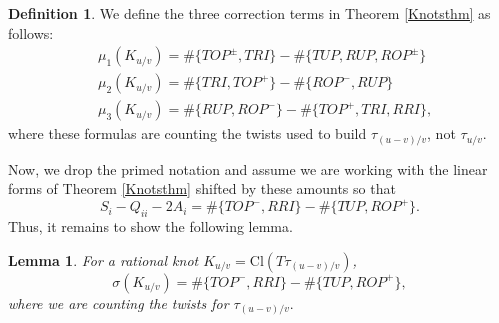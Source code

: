 \documentclass[11pt]{amsart}
\theoremstyle{plain}
\newtheorem{lemmaN}[theoremN]{Lemma}
\theoremstyle{definition}
\newtheorem{definitionN}[theoremN]{Definition}
\theoremstyle{remark}
\begin{document}
\begin{definitionN}
\label{correctiontermsdef}
    We define the three correction terms in Theorem \ref{Knotsthm} as follows:
    \begin{align}
    &\mu_1(K_{u/v})=\#\{TOP^\pm,TRI\}-\#\{TUP,RUP,ROP^\pm\}\\
    &\mu_2(K_{u/v})=\#\{TRI,TOP^+\}-\#\{ROP^-,RUP\}\\
    &\mu_3(K_{u/v})=\#\{RUP,ROP^-\}-\#\{TOP^+,TRI,RRI\},
\end{align}
where these formulas are counting the twists used to build $\tau_{(u-v)/v}$, not $\tau_{u/v}$.
\end{definitionN}

Now, we drop the primed notation and assume we are working with the linear forms of Theorem \ref{Knotsthm} shifted by these amounts so that 
\[
S_i-Q_{ii}-2A_i=\#\{TOP^-,RRI\}-\#\{TUP,ROP^+\}.
\]
Thus, it remains to show the following lemma.

\begin{lemmaN}
    For a rational knot $K_{u/v}=\text{Cl}(T\tau_{(u-v)/v})$, 
    \[
    \sigma(K_{u/v})=\#\{TOP^-,RRI\}-\#\{TUP,ROP^+\},
    \]
    where we are counting the twists for $\tau_{(u-v)/v}.$
\end{lemmaN}
\end{document}

